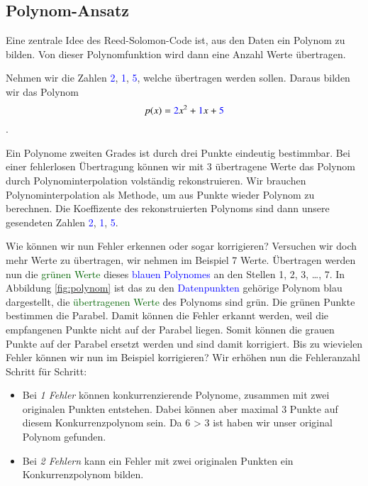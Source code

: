 \subsection{Polynom-Ansatz
\label{reedsolomon:section:polynomansatz}}
Eine zentrale Idee des Reed-Solomon-Code ist, aus den Daten ein Polynom zu bilden. 
Von dieser Polynomfunktion wird dann eine Anzahl Werte übertragen.
\begin{beispiel} Nehmen wir die Zahlen \textcolor{blue}{2}, \textcolor{blue}{1}, \textcolor{blue}{5},
    welche übertragen werden sollen. Daraus bilden wir das Polynom
\begin{equation}
p(x)
=
\textcolor{blue}{2}x^2 + \textcolor{blue}{1}x + \textcolor{blue}{5}
\label{reedsolomon:equation1}
\end{equation}.
\par 
Ein Polynome zweiten Grades ist durch drei Punkte eindeutig bestimmbar. 
Bei einer fehlerlosen Übertragung können wir mit 3 übertragene Werte
    das Polynom durch Polynominterpolation volständig rekonstruieren.
Wir brauchen Polynominterpolation als Methode, um aus Punkte wieder Polynom zu berechnen.
Die Koeffizente des rekonstruierten Polynoms sind dann unsere gesendeten Zahlen \textcolor{blue}{2}, \textcolor{blue}{1}, \textcolor{blue}{5}.
\par 
Wie können wir nun Fehler erkennen oder sogar korrigieren?
Versuchen wir doch mehr Werte zu übertragen, wir nehmen im Beispiel 7 Werte.
Übertragen werden nun die \textcolor{darkgreen}{grünen Werte} 
    dieses \textcolor{blue}{blauen Polynomes} an den Stellen 1, 2, 3, \dots , 7.
In Abbildung \ref{fig:polynom} ist das zu den \textcolor{blue}{Datenpunkten} gehörige Polynom blau dargestellt,
    die \textcolor{darkgreen}{übertragenen Werte} des Polynoms sind grün.
Die grünen Punkte bestimmen die Parabel. 
Damit können die Fehler erkannt werden, weil die empfangenen Punkte nicht auf der Parabel liegen.
Somit können die grauen Punkte auf der Parabel ersetzt werden und sind damit korrigiert.
Bis zu wievielen Fehler können wir nun im Beispiel korrigieren?
Wir erhöhen nun die Fehleranzahl Schritt für Schritt:
\begin{itemize}
    \item Bei \textit{1 Fehler} können konkurrenzierende Polynome, zusammen mit zwei originalen Punkten entstehen.
        Dabei können aber maximal 3 Punkte auf diesem Konkurrenzpolynom sein.
        Da 6 > 3 ist haben wir unser original Polynom gefunden.
    \item Bei \textit{2 Fehlern} kann ein Fehler mit zwei originalen Punkten ein Konkurrenzpolynom bilden.

\end{itemize}
\end{beispiel}
